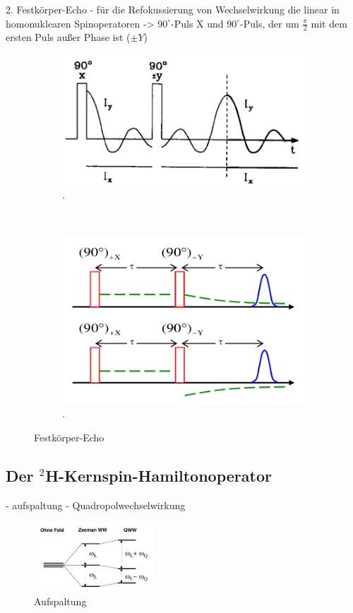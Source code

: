 2. Festk\"{o}rper-Echo
- f\"{u}r die Refokussierung von Wechselwirkung die linear in homonuklearen Spinoperatoren 
-> $90^{\circ}$-Puls X und $90^{\circ}$-Puls, der um $\frac{\pi}{2}$ mit dem ersten Puls au{\ss}er Phase ist ($\pm Y$)
\begin{figure}
\centering
	\begin{subfigure}[b]{0.4\textwidth}
		\includegraphics[width=\textwidth]{Plots/festkoerperecho.png}
		\caption{.}
		\label{.}
	\end{subfigure}
	~
	\begin{subfigure}[b]{0.4\textwidth}
		\includegraphics[width=\textwidth]{Plots/festkoerperecho2.png}
		\caption{.}
		\label{.}
	\end{subfigure}
\caption{Festk\"{o}rper-Echo}
\label{.}
\end{figure}


\subsection{Der $^2$H-Kernspin-Hamiltonoperator}
- aufspaltung
- Quadropolwechselwirkung
\begin{figure}[hbtp]
	\centering
	\includegraphics[width=0.4\textwidth]{Plots/aufspaltung.png}
	\caption{Aufspaltung}
	\label{}
\end{figure}



